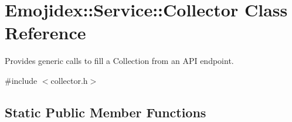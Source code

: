 \hypertarget{classEmojidex_1_1Service_1_1Collector}{}\section{Emojidex\+:\+:Service\+:\+:Collector Class Reference}
\label{classEmojidex_1_1Service_1_1Collector}


Provides generic calls to fill a Collection from an A\+PI endpoint.  




{\ttfamily \#include $<$collector.\+h$>$}

\subsection*{Static Public Member Functions}
